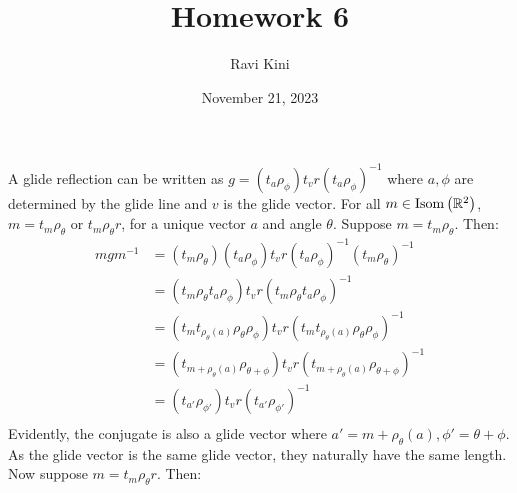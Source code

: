 \documentclass{article}
\title{Homework 6}
\author{Ravi Kini}
\date{November 21, 2023}
\begin{document}
\maketitle

A glide reflection can be written as $g = \left(t_a\rho_{\phi}\right)t_vr\left(t_a\rho_{\phi}\right)^{-1}$ where $a, \phi$ are determined by the glide line and $v$ is the glide vector. For all $m \in \mathrm{Isom}\left(\mathbb{R}^2\right)$, $m = t_m\rho_{\theta}$ or $t_m\rho_{\theta}r$, for a unique vector $a$ and angle $\theta$. Suppose $m = t_m\rho_{\theta}$. Then:
\begin{equation}
    \begin{split}
        mgm^{-1} & = \left(t_m\rho_{\theta}\right)\left(t_a\rho_{\phi}\right)t_vr\left(t_a\rho_{\phi}\right)^{-1}\left(t_m\rho_{\theta}\right)^{-1} \\
        & = \left(t_m\rho_{\theta}t_a\rho_{\phi}\right)t_vr\left(t_m\rho_{\theta}t_a\rho_{\phi}\right)^{-1} \\
        & = \left(t_mt_{\rho_{\theta}\left(a\right)}\rho_{\theta}\rho_{\phi}\right)t_vr\left(t_mt_{\rho_{\theta}\left(a\right)}\rho_{\theta}\rho_{\phi}\right)^{-1} \\
        & = \left(t_{m + \rho_{\theta}\left(a\right)}\rho_{\theta + \phi}\right)t_vr\left(t_{m + \rho_{\theta}\left(a\right)}\rho_{\theta + \phi}\right)^{-1} \\
        & = \left(t_{a'}\rho_{\phi'}\right)t_vr\left(t_{a'}\rho_{\phi'}\right)^{-1} \\
    \end{split}
\end{equation}
Evidently, the conjugate is also a glide vector where $a' = m + \rho_{\theta}\left(a\right), \phi' = \theta + \phi$. As the glide vector is the same glide vector, they naturally have the same length. Now suppose $m = t_m\rho_{\theta}r$. Then:
\end{document}
